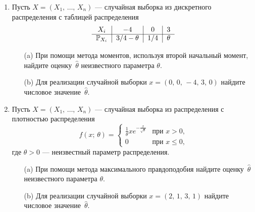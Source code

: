 \documentclass[12pt, a4paper]{article}\usepackage[]{graphicx}\usepackage[]{color}
\begin{document}
\begin{enumerate}
\item
Пусть $X = (X_1, \, \ldots, \, X_n)$ — случайная выборка из дискретного распределения с таблицей распределения
\[
\begin{tabular}{c|c|c|c}
  $X_i$                & $-4$            & $0$    & $3$   \\ \cline{1-4}
  $\P_{X_i}$   & $3/4 - \theta$  & $1/4$  & $\theta$ \\
\end{tabular}
\]
\begin{itemize}
  \item[(a)] При помощи метода моментов, используя второй начальный момент, найдите оценку~$\widehat{\theta}$ неизвестного параметра $\theta$.
  \item[(b)] Для реализации случайной выборки $x = (0, \, 0, \, -4, \, 3, \, 0)$ найдите числовое значение~$\widehat{\theta}$.
\end{itemize}

\item
Пусть $X = (X_1, \, \ldots, \, X_n)$ — случайная выборка из распределения с плотностью распределения
\[
    f(x; \, \theta) = \left\{
                        \begin{array}{ll}
                          \tfrac{1}{\theta}xe^{-\tfrac{x}{\sqrt{\theta}}} & \text{при $x > 0$,} \\
                          0 & \text{при $x \leq 0$,}
                        \end{array}
                      \right.
\]
где $\theta > 0$ — неизвестный параметр распределения.
\begin{itemize}
  \item[(a)] При помощи метода максимального правдоподобия найдите оценку~$\widehat{\theta}$ неизвестного параметра $\theta$.
  \item[(b)] Для реализации случайной выборки $x = (2, \, 1, \, 3, \, 1)$ найдите числовое значение~$\widehat{\theta}$.
\end{itemize}


\end{enumerate}
\end{document}

